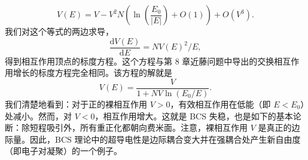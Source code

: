 \begin{equation*}
V(E)=V-V^2N\left(\ln\left(\frac{E_0}{|E|}\right)+O(1)\right)+O(V^3). \tag{12.114}
\end{equation*}
我们对这个等式的两边求导，
\begin{equation*}
\frac{\mathrm d V(E)}{\mathrm d E}=NV(E)^2/E, \tag{12.115}
\end{equation*}
得到相互作用顶点的标度方程。这个方程与第 8 章近藤问题中导出的交换相互作用增长的标度方程完全相同。该方程的解就是
\begin{equation*}
V(E)=\frac{V}{1+NV\ln(E_0/E)}. \tag{12.116}
\end{equation*}
我们清楚地看到：对于正的裸相互作用 $V>0$，有效相互作用在低能（即 $E<E_0$）处减小。然而，对 $V<0$，相互作用增大。这就是 BCS 失稳，也是如下的基本论断：除短程吸引外，所有重正化都朝向费米面。注意，裸相互作用 $V$ 是真正的边际量。因此，BCS 理论中的超导电性是边际耦合变大并在强耦合处产生新自由度（即电子对凝聚）的一个例子。

